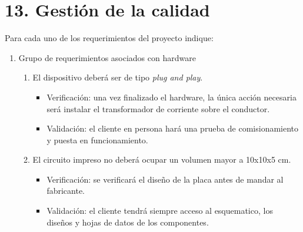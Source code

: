 \documentclass[11pt]{charter}
\begin{document}
\section{13. Gestión de la calidad}
\label{sec:calidad}
Para cada uno de los requerimientos del proyecto indique:
\begin{enumerate}
	\item Grupo de requerimientos asociados con hardware
	\begin{enumerate}[label*=\arabic*.]
			\item El dispositivo deberá ser de tipo \textit{plug and play}.
				\begin{itemize}
					\item Verificación: una vez finalizado el hardware, la única acción necesaria será instalar el transformador de corriente sobre el conductor.\\
					\item Validación: el cliente en persona hará una prueba de comisionamiento y puesta en funcionamiento.\\
				\end{itemize}
				
			\item El circuito impreso no deberá ocupar un volumen mayor a 10x10x5 cm.
				\begin{itemize}
					\item Verificación: se verificará el diseño de la placa antes de mandar al fabricante.\\
					\item Validación: el cliente tendrá siempre acceso al esquematico, los diseños y hojas de datos de los componentes.\\
				\end{itemize}
				

\end{enumerate}
\end{enumerate}
\end{document}
